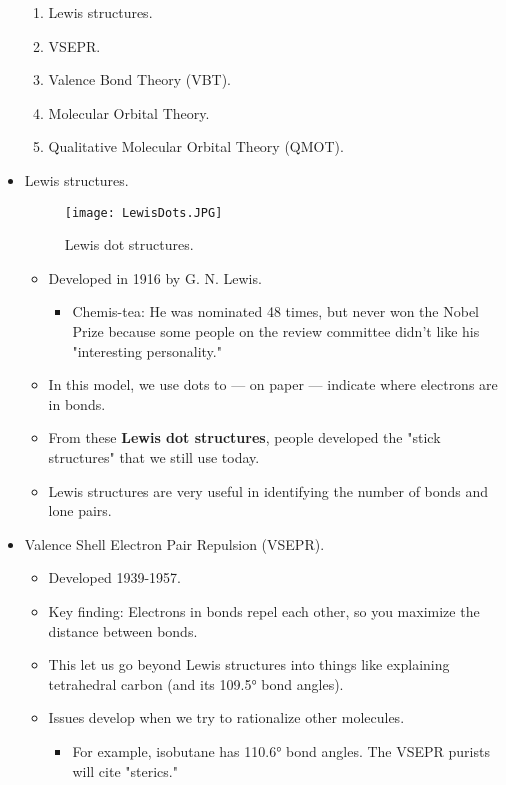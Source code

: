 \documentclass[../notes.tex]{subfiles}
\begin{document}
\begin{itemize}
\begin{enumerate}
        \item Lewis structures.
        \item VSEPR.
        \item Valence Bond Theory (VBT).
        \item Molecular Orbital Theory.
        \item Qualitative Molecular Orbital Theory (QMOT).
    \end{enumerate}
    \item Lewis structures.
    \begin{figure}[h!]
        \centering
        \texttt{[image: LewisDots.JPG]}
        \caption{Lewis dot structures.}
        \label{fig:LewisDots}
    \end{figure}
    \pagebreak
    \begin{itemize}
        \item Developed in 1916 by G. N. Lewis.
        \begin{itemize}
            \item Chemis-tea: He was nominated 48 times, but never won the Nobel Prize because some people on the review committee didn't like his "interesting personality."
        \end{itemize}
        \item In this model, we use dots to --- on paper --- indicate where electrons are in bonds.
        \item From these \textbf{Lewis dot structures}, people developed the "stick structures" that we still use today.
        \item Lewis structures are very useful in identifying the number of bonds and lone pairs.
    \end{itemize}
    \item Valence Shell Electron Pair Repulsion (VSEPR).
    \begin{itemize}
        \item Developed 1939-1957.
        \item Key finding: Electrons in bonds repel each other, so you maximize the distance between bonds.
        \item This let us go beyond Lewis structures into things like explaining tetrahedral carbon (and its \ang{109.5} bond angles).
        \item Issues develop when we try to rationalize other molecules.
        \begin{itemize}
            \item For example, isobutane has \ang{110.6}  bond angles. The VSEPR purists will cite "sterics."

\end{itemize}
\end{itemize}
\end{itemize}
\end{document}
